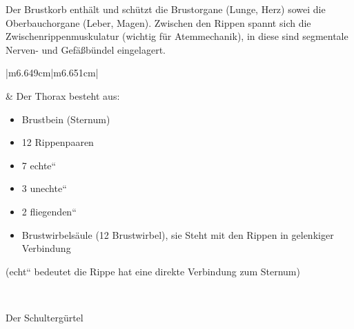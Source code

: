 \documentclass{article}
\begin{document}
Der Brustkorb enth\"alt und sch\"utzt die Brust\-organe (Lunge, Herz)
sowei die Oberbauchorgane (Leber, Magen). Zwischen den Rippen spannt
sich die Zwischenrippenmuskulatur (wichtig f\"ur Atemmechanik), in
diese sind segmentale Nerven- und Gef\"a{\ss}b\"undel eingelagert.

\begin{center}
\tablehead{}\begin{supertabular}{|m{6.649cm}|m{6.651cm}|}
 

 &
Der Thorax besteht aus:

\begin{itemize}
\item Brustbein  (Sternum)

\item 12  Rippenpaaren 

\end{itemize}
\begin{itemize}
\item 7 {\quotedblbase}echte{\textquotedblleft}  

\item 3 {\quotedblbase}unechte{\textquotedblleft}

\item 2 {\quotedblbase}fliegenden{\textquotedblleft}

\end{itemize}
\begin{itemize}
\item Brustwirbels\"aule (12 Brust\-wirbel), sie Steht mit den Rippen in
gelenkiger Verbindung 

\end{itemize}
({\quotedblbase}echt{\textquotedblleft} bedeutet die Rippe hat eine
direkte Verbindung zum Sternum)

\\\hline
\end{supertabular}
\end{center}
Der Schulterg\"urtel
\end{document}
